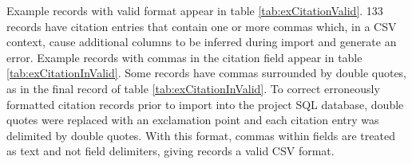 \documentclass[10pt, letterpaper]{article}
\begin{document}
\begin{spacing}{1.0}
Example records with valid format appear in table \ref{tab:exCitationValid}.  133 records have citation entries that  contain one or more commas which, in a CSV context, cause additional columns to be inferred during import and generate an error.  Example records with commas in the citation field appear in table \ref{tab:exCitationInValid}.  Some  records have commas surrounded by double quotes, as in the final record of table \ref{tab:exCitationInValid}.  To correct erroneously formatted citation records prior to import into the project SQL database, double quotes were replaced with an exclamation point and each citation entry was delimited by double quotes.  With this format, commas within fields are treated as text and not field delimiters, giving records a valid CSV format.

\vspace{0.5in}


\end{spacing}
\end{document}

